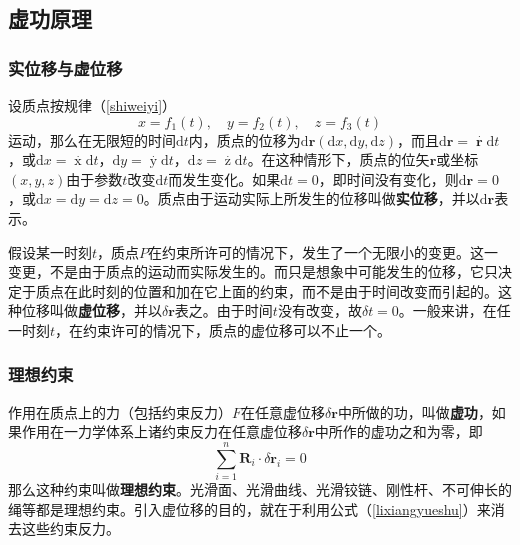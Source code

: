 \documentclass[withoutpreface,bwprint]{cumcmthesis} %
\begin{document}
\subsection{虚功原理}
\subsubsection{实位移与虚位移}
\par 设质点按规律（\ref{shiweiyi}）
\begin{equation}
	\label{shiweiyi}
	x = f_1(t),\quad y = f_2(t),\quad z = f_3(t)
\end{equation}
运动，那么在无限短的时间$\mathrm{d}t$内，质点的位移为$\mathrm{d} \textbf{r}(\mathrm{d}x,\mathrm{d}y,\mathrm{d}z)$，而且$\mathrm{d} \textbf{r} = \mathop{\textbf{r}}\limits^{\cdot} \mathrm{d}t$，或$\mathrm{d}x = \mathop{x}\limits^{\cdot} \mathrm{d}t$，$\mathrm{d}y = \mathop{y}\limits^{\cdot} \mathrm{d}t$，$\mathrm{d}z = \mathop{z}\limits^{\cdot} \mathrm{d}t$。在这种情形下，质点的位矢$\textbf{r}$或坐标$(x,y,z)$由于参数$t$改变$\mathrm{d}t$而发生变化。如果$\mathrm{d}t = 0$，即时间没有变化，则$\mathrm{d} \textbf{r} = 0$，或$\mathrm{d}x= \mathrm{d}y= \mathrm{d}z=0$。质点由于运动实际上所发生的位移叫做\textbf{实位移}，并以$\mathrm{d} \textbf{r}$表示。
\par 假设某一时刻$t$，质点$P$在约束所许可的情况下，发生了一个无限小的变更。这一变更，不是由于质点的运动而实际发生的。而只是想象中可能发生的位移，它只决定于质点在此时刻的位置和加在它上面的约束，而不是由于时间改变而引起的。这种位移叫做\textbf{虚位移}，并以$\delta \textbf{r}$表之。由于时间$t$没有改变，故$\delta t =0$。一般来讲，在任一时刻$t$，在约束许可的情况下，质点的虚位移可以不止一个。
\subsubsection{理想约束}
\par 作用在质点上的力（包括约束反力）$F$在任意虚位移$\delta \textbf{r}$中所做的功，叫做\textbf{虚功}，如果作用在一力学体系上诸约束反力在任意虚位移$\delta \textbf{r}$中所作的虚功之和为零，即
\begin{equation}
	\label{lixiangyueshu}
	\sum\limits_{i=1}^{n} \textbf{R}_i \cdot \delta \textbf{r}_i = 0
\end{equation}
那么这种约束叫做\textbf{理想约束}。光滑面、光滑曲线、光滑铰链、刚性杆、不可伸长的绳等都是理想约束。引入虚位移的目的，就在于利用公式（\ref{lixiangyueshu}）来消去这些约束反力。
\end{document}
